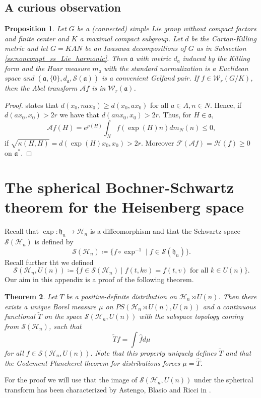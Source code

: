 \documentclass[12pt,reqno,a4paper]{amsart}
\theoremstyle{theorem}
\newtheorem{theorem}{Theorem}[section]
\newtheorem{proposition}[theorem]{Proposition}
\theoremstyle{definition}
\numberwithin{theorem}{section}
\numberwithin{equation}{section}
\begin{document}
\subsection{A curious observation}
\begin{proposition}
	Let $G$ be a (connected) simple Lie group without compact factors and finite center and $K$ a maximal compact subgroup. Let $d$ be the Cartan-Killing metric and let $G=KAN$ be an Iwasawa decompositions of $G$ as in Subsection \ref{ss:noncompt_ss_Lie_harmonic}. Then $\mathfrak{a}$ with metric $d_{\mathfrak{a}}$ induced by the Killing form and the Haar measure $m_\mathfrak{a}$ with the standard normalization is a Euclidean space and $(\mathfrak{a}, \{0\}, d_\mathfrak{a}, \mathscr{S}(\mathfrak{a}))$ is a convenient Gelfand pair. If $f\in \mathcal{W}_r(G/K)$, then the Abel transform $\mathcal{A}f$ is in $\mathcal{W}_r(\mathfrak{a})$.
\end{proposition}
\begin{proof}
	\cite[Chapter VI, Exercise B2.(iv)]{Helgason2} states that
	$d(x_0,nax_0)\geq d(x_0, ax_0)$
	for all $a\in A, n\in N$.
	Hence, if $d(ax_0, x_0)>2r$ we have that $d(anx_0,x_0)>2r$. Thus, for $H\in \mathfrak{a}$, 
	\[\mathcal{A}f(H) = e^{\rho(H)}\int_Nf(\exp(H)n)dm_N(n)\leq 0,\]
	if $\sqrt{\kappa(H, H)} = d(\exp(H)x_0,x_0)>2r$.
	Moreover $\mathcal{F}(\mathcal{A}f) = \mathcal{H}(f)\geq0$ on $\mathfrak{a}^*$.
\end{proof}
\appendix
\section{The spherical Bochner-Schwartz theorem for the Heisenberg space}\label{S:Bochner-Schwarz appendix}
Recall that $\exp:\mathfrak{h}_n\to \mathcal{H}_n$ is a diffeomorphism and that the Schwartz space $\mathscr{S}(\mathcal{H}_n)$ is defined by 
\[\mathscr{S}(\mathcal{H}_n)\coloneqq \{f\circ \exp^{-1}\mid f\in \mathscr{S}(\mathfrak{h}_n)\}.\]
Recall further tht we defined
\[\mathscr{S}(\mathcal{H}_n, U(n))\coloneqq \{f\in \mathscr{S}(\mathcal{H}_n)\mid f(t,kv) = f(t,v)\text{ for all $k\in U(n)$}\}.\]
Our aim in this appendix is a proof of the following theorem.
\begin{theorem}\label{Bochner Schwartz Heisenberg}
	Let $T$ be a positive-definite distribution on $\mathcal{H}_n\rtimes U(n)$.
	Then there exists a unique Borel measure $\mu$ on $PS(\mathcal{H}_n\rtimes U(n), U(n))$ and a continuous functional $\tilde{T}$ on the space $\mathscr{S}(\mathcal{H}_n, U(n))$ with the subspace topology coming from $\mathscr{S}(\mathcal{H}_n)$, such that
	\[
	\tilde{T}f = \int \widehat{f}d\mu
	\]
	for all $f\in \mathscr{S}(\mathcal{H}_n, U(n))$.
	Note that this property uniquely defines $\tilde{T}$ and that the Godement-Plancherel theorem for distributions forces $\mu = \widehat{T}$.
\end{theorem}
For the proof we will use that the image of $\mathscr{S}(\mathcal H_n, U(n))$ under the spherical transform has been characterized by Astengo, Blasio and Ricci in \cite{AdBRSphericalSchwartz}.
\end{document}
